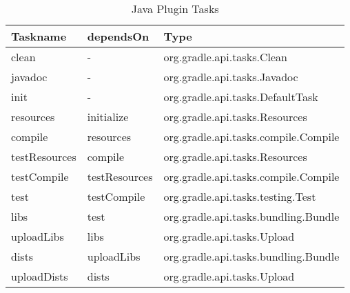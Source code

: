 \begin{table}[h]
	\begin{center}
		\begin{tabular}{|l|l|l|} \hline
			\textbf{Taskname} & \textbf{dependsOn} & \textbf{Type} \\ \hline
			clean & - & org.gradle.api.tasks.Clean \\ \hline
			javadoc & - & org.gradle.api.tasks.Javadoc \\ \hline
			init & - & org.gradle.api.tasks.DefaultTask \\ \hline
			resources & initialize & org.gradle.api.tasks.Resources \\ \hline
			compile & resources & org.gradle.api.tasks.compile.Compile \\ \hline
			testResources & compile & org.gradle.api.tasks.Resources \\ \hline
			testCompile & testResources & org.gradle.api.tasks.compile.Compile \\ \hline
			test & testCompile & org.gradle.api.tasks.testing.Test \\ \hline
			libs & test & org.gradle.api.tasks.bundling.Bundle \\ \hline
			uploadLibs & libs & org.gradle.api.tasks.Upload \\ \hline
			dists & uploadLibs & org.gradle.api.tasks.bundling.Bundle \\ \hline
			uploadDists & dists & org.gradle.api.tasks.Upload \\ \hline
		\end{tabular}
	\end{center}
	\caption{Java Plugin Tasks}	
	\label{javatasks}
\end{table}

